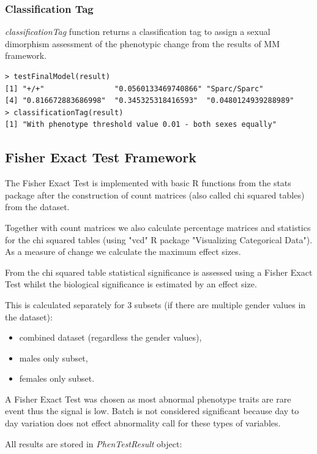 \documentclass[12pt,a4paper]{article}
\begin{document}
\subsubsection{Classification Tag}
\textit{classificationTag} function returns a classification tag to assign a sexual dimorphism assessment of the phenotypic change from the results of MM framework.
\begingroup
    \fontsize{8pt}{12pt}\selectfont
\begin{verbatim}
> testFinalModel(result)
[1] "+/+"                "0.0560133469740866" "Sparc/Sparc"       
[4] "0.816672883686998"  "0.345325318416593"  "0.0480124939288989"
> classificationTag(result)
[1] "With phenotype threshold value 0.01 - both sexes equally"
\end{verbatim}
\endgroup


\subsection{Fisher Exact Test Framework}
\label{section:FET}
The Fisher Exact Test is implemented with basic R functions from the stats package after the construction of count matrices (also called chi squared tables) from the dataset. 

Together with count matrices we also calculate percentage matrices and statistics for the chi squared tables (using "vcd" R package "Visualizing Categorical Data").  As a measure of change we calculate the maximum effect sizes. 

From the chi squared table statistical significance is assessed using a Fisher Exact Test whilst the biological significance is estimated by an effect size.

This is calculated separately for 3 subsets (if there are multiple gender values in the dataset):
\begin{itemize}
 \item combined dataset (regardless the gender values),
 \item males only subset,
 \item females only subset.
\end{itemize}

A Fisher Exact Test was chosen as most abnormal phenotype traits are rare event thus the signal is low. Batch is not considered significant because day to day variation does not effect abnormality call for these types of variables.

All results are stored in \textit{PhenTestResult} object:
\end{document}
